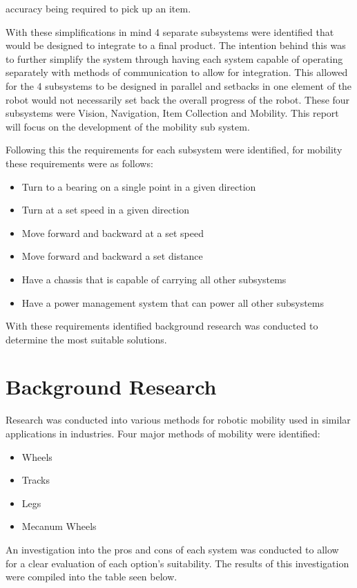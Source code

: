 \documentclass{article}
\begin{document}
accuracy being required to pick up an item.
\par
With these simplifications in mind 4 separate subsystems were identified that would be designed to integrate to a final product. The intention behind this was to further
simplify the system through having each system capable of operating separately with methods of communication to allow for integration. This allowed for the 4 subsystems
to be designed in parallel and setbacks in one element of the robot would not necessarily set back the overall progress of the robot. These four subsystems were Vision,
Navigation, Item Collection and Mobility. This report will focus on the development of the mobility sub system.
\par
Following this the requirements for each subsystem were identified, for mobility these requirements were as follows:
\begin{itemize}
    \item Turn to a bearing on a single point in a given direction
    \item Turn at a set speed in a given direction
    \item Move forward and backward at a set speed
    \item Move forward and backward a set distance
    \item Have a chassis that is capable of carrying all other subsystems
    \item Have a power management system that can power all other subsystems
\end{itemize}
With these requirements identified background research was conducted to determine the most suitable solutions.

\pagebreak
\section{Background Research}
Research was conducted into various methods for robotic mobility used in similar applications in industries. Four major methods of mobility were identified:
\begin{itemize}
    \item Wheels
    \item Tracks
    \item Legs
    \item Mecanum Wheels
\end{itemize}
An investigation into the pros and cons of each system was conducted to allow for a clear evaluation of each option's suitability. The results of this investigation were
compiled into the table seen below.
\end{document}

